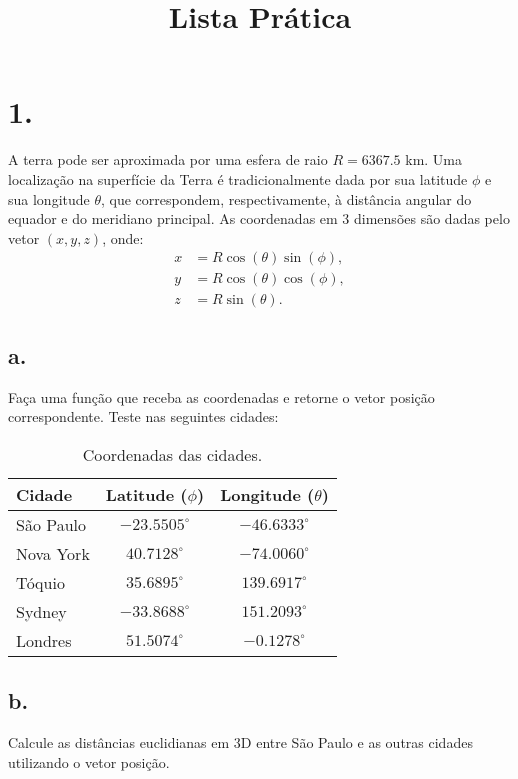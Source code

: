 \documentclass[a4paper,12pt]{article}
\title{Lista Prática}
\author{}
\date{}
\begin{document}
\maketitle

\section*{1.}

A terra pode ser aproximada por uma esfera de raio $R = 6367.5$ km. Uma localização na superfície da Terra é tradicionalmente dada por sua latitude $\phi$ e sua longitude $\theta$, que correspondem, respectivamente, à distância angular do equador e do meridiano principal. As coordenadas em 3 dimensões são dadas pelo vetor $(x,y,z)$, onde:
\[
\begin{aligned}
x &= R \cos(\theta) \sin(\phi), \\
y &= R \cos(\theta) \cos(\phi), \\
z &= R \sin(\theta).
\end{aligned}
\]

\subsection*{a.}
Faça uma função que receba as coordenadas e retorne o vetor posição correspondente. Teste nas seguintes cidades:

\begin{table}[h!]
    \centering
    \begin{tabular}{|l|c|c|}
        \hline
        \textbf{Cidade} & \textbf{Latitude ($\phi$)} & \textbf{Longitude ($\theta$)} \\
        \hline
        São Paulo & $-23.5505^\circ$ & $-46.6333^\circ$ \\
        Nova York & $40.7128^\circ$ & $-74.0060^\circ$ \\
        Tóquio & $35.6895^\circ$ & $139.6917^\circ$ \\
        Sydney & $-33.8688^\circ$ & $151.2093^\circ$ \\
        Londres & $51.5074^\circ$ & $-0.1278^\circ$ \\
        \hline
    \end{tabular}
    \caption{Coordenadas das cidades.}
\end{table}

\subsection*{b.}
Calcule as distâncias euclidianas em 3D entre São Paulo e as outras cidades utilizando o vetor posição.
\end{document}
